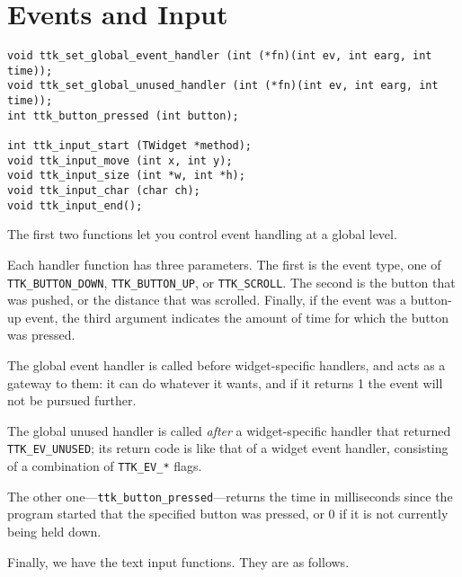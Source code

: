 \documentclass[12pt,letterpaper]{report}
\let\ttt\tt
\def\tt{\def\_{{\ttt\char`\_}}\ttt}
\def\returns{\hskip1em\relax{\bf Returns }}
\begin{document}
\section{Events and Input}
\begin{verbatim}
void ttk_set_global_event_handler (int (*fn)(int ev, int earg, int time));
void ttk_set_global_unused_handler (int (*fn)(int ev, int earg, int time));
int ttk_button_pressed (int button);

int ttk_input_start (TWidget *method);
void ttk_input_move (int x, int y);
void ttk_input_size (int *w, int *h);
void ttk_input_char (char ch);
void ttk_input_end();
\end{verbatim}

The first two functions let you control event handling at a global level.

Each handler function has three parameters. The first is the event type, one of
\verb|TTK_BUTTON_DOWN|, \verb|TTK_BUTTON_UP|, or \verb|TTK_SCROLL|.
The second is the button that was pushed, or the distance that was scrolled.
Finally, if the event was a button-up event, the third argument indicates the
amount of time for which the button was pressed.

The global event handler is called before widget-specific handlers, and acts
as a gateway to them: it can do whatever it wants, and if it returns 1 the
event will not be pursued further.

The global unused handler is called \emph{after} a widget-specific handler that
returned \verb|TTK_EV_UNUSED|; its return code is like that of a widget event
handler, consisting of a combination of \verb|TTK_EV_*| flags.

The other one---\verb|ttk_button_pressed|---returns the time in milliseconds
since the program started that the specified button was pressed, or 0 if it
is not currently being held down.

Finally, we have the text input functions. They are as follows.
\end{document}
